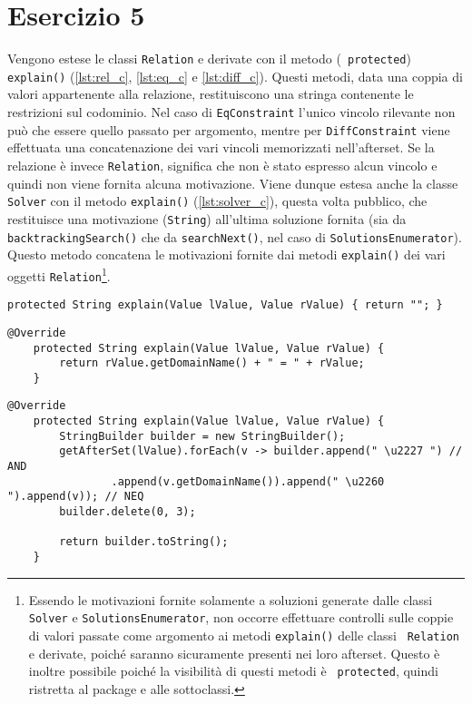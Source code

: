 \section*{Esercizio 5}\label{sec:ex5}

Vengono estese le classi {\tt Relation} e derivate con il metodo ({\tt
protected}) {\tt explain()} (\autoref{lst:rel_c}, \ref{lst:eq_c} e
\ref{lst:diff_c}). Questi metodi, data una coppia di valori appartenente alla
relazione, restituiscono una stringa contenente le restrizioni sul codominio.
Nel caso di {\tt EqConstraint} l'unico vincolo rilevante non può che essere
quello passato per argomento, mentre per {\tt DiffConstraint} viene effettuata
una concatenazione dei vari vincoli memorizzati nell'afterset. Se la relazione è
invece {\tt Relation}, significa che non è stato espresso alcun vincolo e quindi
non viene fornita alcuna motivazione. Viene dunque estesa anche la classe {\tt
Solver} con il metodo {\tt explain()} (\autoref{lst:solver_c}), questa volta
pubblico, che restituisce una motivazione ({\tt String}) all'ultima soluzione
fornita (sia da {\tt backtrackingSearch()} che da {\tt searchNext()}, nel caso
di {\tt SolutionsEnumerator}). Questo metodo concatena le motivazioni fornite
dai metodi {\tt explain()} dei vari oggetti {\tt Relation}\footnote{Essendo le
motivazioni fornite solamente a soluzioni generate dalle classi {\tt Solver} e
{\tt SolutionsEnumerator}, non occorre effettuare controlli sulle coppie di
valori passate come argomento ai metodi {\tt explain()} delle classi {\tt
Relation} e derivate, poiché saranno sicuramente presenti nei loro afterset.
Questo è inoltre possibile poiché la visibilità di questi metodi è {\tt
protected}, quindi ristretta al package e alle sottoclassi.}.
%
\begin{lstlisting}[caption=Relation.java (cont.), label=lst:rel_c, firstnumber=29]
    protected String explain(Value lValue, Value rValue) { return ""; }
\end{lstlisting}
%
\begin{lstlisting}[caption=EqConstraint.java (cont.), label=lst:eq_c, firstnumber=15]
    @Override
    protected String explain(Value lValue, Value rValue) {
        return rValue.getDomainName() + " = " + rValue;
    }
\end{lstlisting}
%
\begin{lstlisting}[caption=DiffConstraint.java (cont.), label=lst:diff_c, firstnumber=16]
    @Override
    protected String explain(Value lValue, Value rValue) {
        StringBuilder builder = new StringBuilder();
        getAfterSet(lValue).forEach(v -> builder.append(" \u2227 ") // AND
                .append(v.getDomainName()).append(" \u2260 ").append(v)); // NEQ
        builder.delete(0, 3);

        return builder.toString();
    }
\end{lstlisting}
